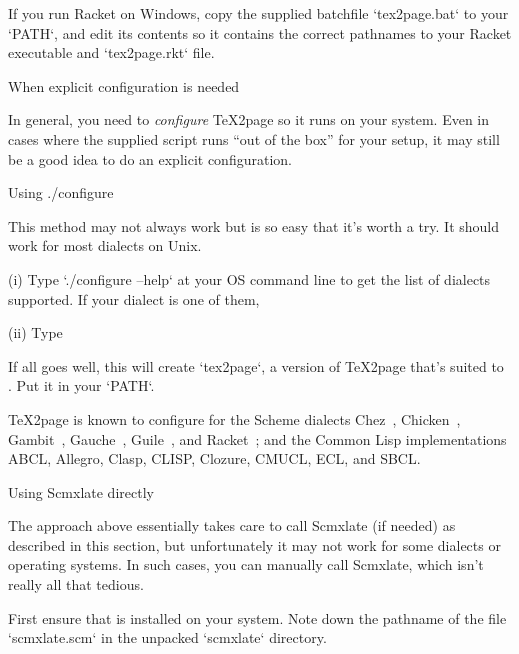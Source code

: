 {{{{{{{{{If you run Racket on Windows,
copy the supplied batchfile `tex2page.bat`
to your `PATH`, and edit its contents so it contains
the correct pathnames to your Racket executable and
`tex2page.rkt` file.


\beginsection When explicit configuration is needed

In general, you need to {\em
configure}
\TeX2page so it runs on your system.  Even in cases where the supplied
script runs “out of the box” for your setup, it may still be a good
idea to do an explicit configuration.

\beginsection Using {./configure}

This method may not always work but is so easy that
it’s worth a try.  It should work for most
dialects on Unix.

(i) Type `./configure --help` at your OS command line
to get the list of dialects supported.
If your dialect  is one of them,

(ii) Type  

\n If all goes well, this will create
`tex2page`, a version of \TeX2page that’s suited to .
Put it in your `PATH`.

\TeX2page is known to configure for the Scheme dialects
Chez~\cite{chez},
Chicken~\cite{chicken},
Gambit~\cite{gambit},
Gauche~\cite{gauche},
Guile~\cite{guile},
and Racket~\cite{racket}; and the Common Lisp
implementations ABCL, Allegro, Clasp, CLISP, Clozure, CMUCL, ECL, and SBCL.

\beginsection  Using Scmxlate directly

The  approach above
essentially takes care to call Scmxlate (if needed) as described in
this section, but unfortunately it may not work for
some dialects or operating systems.  In such cases, you
can manually call Scmxlate, which isn’t really all that
tedious.

First ensure that
is installed on your system.  Note down the pathname of
the file `scmxlate.scm` in the unpacked `scmxlate`
directory.

}}}}}}}}}
